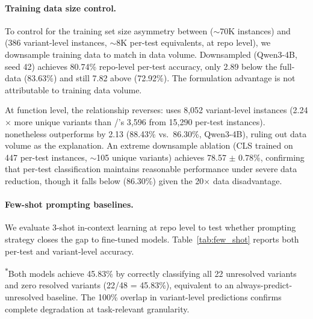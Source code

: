 \paragraph{Training data size control.}
\label{app:downsample}
To control for the training set size asymmetry between \cls{} (${\sim}$70K instances) and \traj{} (386 variant-level instances, ${\sim}$8K per-test equivalents, at repo level), we downsample \cls{} training data to match \traj{} in data volume. Downsampled \cls{} (Qwen3-4B, seed 42) achieves 80.74\% repo-level per-test accuracy, only 2.89\pp{} below the full-data \cls{} (83.63\%) and still 7.82\pp{} above \traj{} (72.92\%). The \cls{} formulation advantage is not attributable to training data volume.

At function level, the relationship reverses: \traj{} uses 8,052 variant-level instances (2.24$\times$ more unique variants than \cls{}/\cwm{}'s 3,596 from 15,290 per-test instances). \cls{} nonetheless outperforms \traj{} by 2.13\pp{} (88.43\% vs.\ 86.30\%, Qwen3-4B), ruling out data volume as the explanation. An extreme downsample ablation (CLS trained on 447 per-test instances, ${\sim}$105 unique variants) achieves 78.57 $\pm$ 0.78\%, confirming that per-test classification maintains reasonable performance under severe data reduction, though it falls below \traj{} (86.30\%) given the 20$\times$ data disadvantage.

\paragraph{Few-shot prompting baselines.}
\label{app:few_shot}
We evaluate 3-shot in-context learning at repo level to test whether prompting strategy closes the gap to fine-tuned models. Table~\ref{tab:few_shot} reports both per-test and variant-level accuracy.

\begin{table}[h]
\centering
\small
\caption{Repo-level prompting baselines (per-test $n{=}9{,}784$; variant-level $n{=}48$). Majority baseline: 72.96\% per-test, 54.17\% variant-level.}
\label{tab:few_shot}
\setlength{\tabcolsep}{4pt}

\vspace{2pt}
{\footnotesize \textsuperscript{$\ast$}Both models achieve 45.83\% by correctly classifying all 22 unresolved variants and zero resolved variants (22/48 = 45.83\%), equivalent to an always-predict-unresolved baseline. The 100\% overlap in variant-level predictions confirms complete degradation at task-relevant granularity.}
\end{table}

